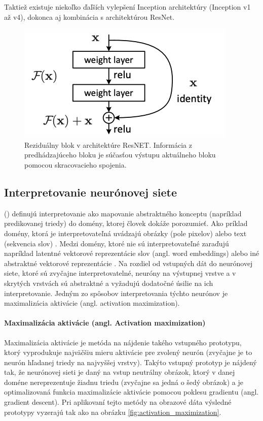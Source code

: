 Taktiež existuje niekoľko ďaľších vylepšení Inception architektúry (Inception v1 až v4), dokonca aj kombinácia s architektúrou ResNet.

\begin{figure}[h!]
    \centering
    \includegraphics[scale=0.6]{assets/images/residual_block.png}
    \caption{Reziduálny blok v architektúre ResNET. Informácia z predhádzajúceho bloku je súčasťou výstupu aktuálneho bloku pomocou skracovacieho spojenia. \cite{he2016deep}}
    \label{fig:residual_block}
\end{figure}

\subsection{Interpretovanie neurónovej siete}

\citeauthor{montavon2018methods} (\citeyear{montavon2018methods}) definujú interpretovanie ako mapovanie abstraktného konceptu (napríklad predikovanej triedy) do domény, ktorej človek dokáže porozumieť. Ako príklad domény, ktorá je interpretovateľná uvádzajú obrázky (pole pixelov) alebo text (sekvencia slov) \cite{montavon2018methods}. Medzi domény, ktoré nie sú interpretovateľné zaraďujú napríklad latentné vektorové reprezentácie slov (angl. word embeddings) alebo iné abstraktné vektorové reprezentácie \cite{montavon2018methods}.
Na rozdiel od vstupných dát do neurónovej siete, ktoré sú zvyčajne interpretovatelné, neuróny na výstupnej vrstve a v skrytých vrstvách sú abstraktné a vyžadujú dodatočné úsilie na ich interpretovanie. Jedným zo spôsobov interpretovania týchto neurónov je maximalizácia aktivácie (angl. activation maximization).

\paragraph{Maximalizácia aktivácie (angl. Activation maximization)}
Maximalizácia aktivácie je metóda na nájdenie takého vstupného prototypu, ktorý vyprodukuje najväčšiu mieru aktivácie pre zvolený neurón (zvyčajne je to neurón hľadanej triedy na najvyššej vrstvy). 
Takýto vstupný prototyp je nájdený tak, že neurónovej sieti je daný na vstup neutrálny obrázok, ktorý v danej doméne nereprezentuje žiadnu triedu (zvyčajne sa jedná o šedý obrázok) a je optimalizovaná funkcia maximalizácie aktivácie pomocou poklesu gradientu \cite{montavon2018methods} (angl. gradient descent). Pri aplikovaní tejto metódy na obrazové dáta výsledné prototypy vyzerajú tak ako na obrázku \ref{fig:activation_maximization}.

